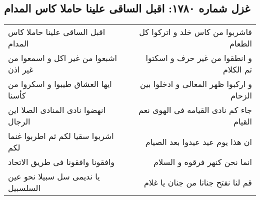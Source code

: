 \begin{center}
\section*{غزل شماره ۱۷۸۰: اقبل الساقی علینا حاملا کاس المدام}
\label{sec:1780}
\begin{longtable}{l p{0.5cm} r}
اقبل الساقی علینا حاملا کاس المدام
&&
فاشربوا من کاس خلد و اترکوا کل الطعام
\\
اشبعوا من غیر اکل و اسمعوا من غیر اذن
&&
و انطقوا من غیر حرف و اسکتوا تم الکلام
\\
ایها العشاق طیبوا و اسکروا من کأسنا
&&
و ارکبوا ظهر المعالی و ادخلوا بین الزحام
\\
انهضوا نادی المنادی الصلا این الرجال
&&
جاء کم نادی القیامه فی الهوی نعم القیام
\\
اشربوا سقیا لکم ثم اطربوا غنما لکم
&&
ان هذا یوم عید عیدوا بعد الصیام
\\
وافقونا وافقونا فی طریق الاتحاد
&&
انما نحن کنهر فرقوه و السلام
\\
یا ندیمی سل سبیلا نحو عین السلسبیل
&&
قم لنا نفتح جنانا من جنان یا غلام
\\
\end{longtable}
\end{center}
